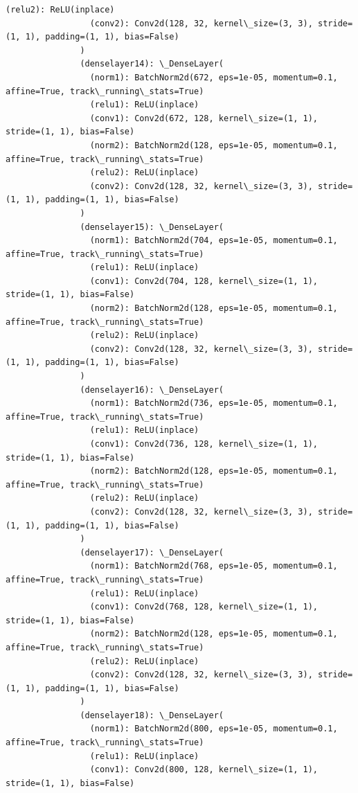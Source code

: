 \documentclass[11pt]{article}
\begin{document}
\begin{Verbatim}[commandchars=\\\{\}]
                 (relu2): ReLU(inplace)
                 (conv2): Conv2d(128, 32, kernel\_size=(3, 3), stride=(1, 1), padding=(1, 1), bias=False)
               )
               (denselayer14): \_DenseLayer(
                 (norm1): BatchNorm2d(672, eps=1e-05, momentum=0.1, affine=True, track\_running\_stats=True)
                 (relu1): ReLU(inplace)
                 (conv1): Conv2d(672, 128, kernel\_size=(1, 1), stride=(1, 1), bias=False)
                 (norm2): BatchNorm2d(128, eps=1e-05, momentum=0.1, affine=True, track\_running\_stats=True)
                 (relu2): ReLU(inplace)
                 (conv2): Conv2d(128, 32, kernel\_size=(3, 3), stride=(1, 1), padding=(1, 1), bias=False)
               )
               (denselayer15): \_DenseLayer(
                 (norm1): BatchNorm2d(704, eps=1e-05, momentum=0.1, affine=True, track\_running\_stats=True)
                 (relu1): ReLU(inplace)
                 (conv1): Conv2d(704, 128, kernel\_size=(1, 1), stride=(1, 1), bias=False)
                 (norm2): BatchNorm2d(128, eps=1e-05, momentum=0.1, affine=True, track\_running\_stats=True)
                 (relu2): ReLU(inplace)
                 (conv2): Conv2d(128, 32, kernel\_size=(3, 3), stride=(1, 1), padding=(1, 1), bias=False)
               )
               (denselayer16): \_DenseLayer(
                 (norm1): BatchNorm2d(736, eps=1e-05, momentum=0.1, affine=True, track\_running\_stats=True)
                 (relu1): ReLU(inplace)
                 (conv1): Conv2d(736, 128, kernel\_size=(1, 1), stride=(1, 1), bias=False)
                 (norm2): BatchNorm2d(128, eps=1e-05, momentum=0.1, affine=True, track\_running\_stats=True)
                 (relu2): ReLU(inplace)
                 (conv2): Conv2d(128, 32, kernel\_size=(3, 3), stride=(1, 1), padding=(1, 1), bias=False)
               )
               (denselayer17): \_DenseLayer(
                 (norm1): BatchNorm2d(768, eps=1e-05, momentum=0.1, affine=True, track\_running\_stats=True)
                 (relu1): ReLU(inplace)
                 (conv1): Conv2d(768, 128, kernel\_size=(1, 1), stride=(1, 1), bias=False)
                 (norm2): BatchNorm2d(128, eps=1e-05, momentum=0.1, affine=True, track\_running\_stats=True)
                 (relu2): ReLU(inplace)
                 (conv2): Conv2d(128, 32, kernel\_size=(3, 3), stride=(1, 1), padding=(1, 1), bias=False)
               )
               (denselayer18): \_DenseLayer(
                 (norm1): BatchNorm2d(800, eps=1e-05, momentum=0.1, affine=True, track\_running\_stats=True)
                 (relu1): ReLU(inplace)
                 (conv1): Conv2d(800, 128, kernel\_size=(1, 1), stride=(1, 1), bias=False)

\end{Verbatim}
\end{document}

